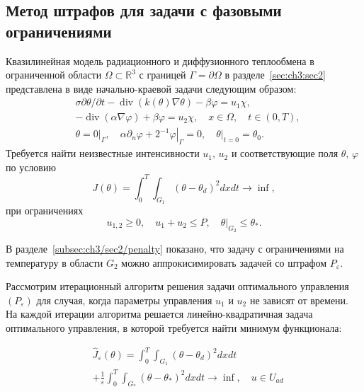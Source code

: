 
\subsection{Метод штрафов для задачи с фазовыми ограничениями}
\label{subsec:ch4/sec3/subsec5}
Квазилинейная модель радиационного и диффузионного теплообмена в ограниченной области
$\Omega \subset \mathbb{R}^{3}$ с границей $\Gamma=\partial \Omega$
в разделе~\ref{sec:ch3:sec2} представлена в виде начально-краевой задачи
следующим образом:
\begin{equation*}
    \begin{aligned}
        & \sigma \partial \theta / \partial t-\operatorname{div}(k(\theta) \nabla \theta)-\beta \varphi=u_{1} \chi, \\
        & -\operatorname{div}(\alpha \nabla \varphi)+\beta \varphi=u_{2} \chi, \quad x \in \Omega, \quad t \in(0, T), \\
        & \theta=\left.0\right|_{\Gamma}, \quad \alpha \partial_{n}
        \varphi+\left.2^{-1} \varphi\right|_{\Gamma}=0,\left.\quad \theta\right|_{t=0}=\theta_{0}.
    \end{aligned}
\end{equation*}
Требуется найти неизвестные интенсивности $u_1,\, u_2$ и соответствующие поля $\theta, \, \varphi$
по условию
\[
    J(\theta)=\int_{0}^{T}
    \int_{G_{1}}\left(\theta-\theta_{d}\right)^{2} d x d t \rightarrow \inf,
\]
при ограничениях
\[
    u_{1,2} \geq 0, \quad u_{1}+u_{2} \leq P,\left.\quad \theta\right|_{G_{2}} \leq \theta_{*}.
\]

В разделе~\ref{subsec:ch3/sec2/penalty} показано, что задачу с ограничениями
на температуру в области $G_2$ можно
аппрокисимировать задачей со штрафом $P_\varepsilon$.


Рассмотрим итерационный алгоритм решения задачи оптимального управления
$\left(P_{\varepsilon}\right)$ для случая, когда параметры управления
$u_{1}$ и $u_{2}$ не зависят от времени.
На каждой итерации алгоритма
решается линейно-квадратичная задача оптимального управления,
в которой требуется найти минимум функционала:

\begin{equation}
    \label{eq:3_2:9}
    \begin{aligned}
        &\widehat{J}_{\varepsilon}(\theta)=\int_{0}^{T}
        \int_{G_{1}}\left(\theta-\theta_{d}\right)^{2} d x d t \\
        &+\frac{1}{\varepsilon} \int_{0}^{T}
        \int_{G_{*}}\left(\theta-\theta_{*}\right)^{2} d x d t
        \rightarrow \inf, \quad u\in U_{a d}
    \end{aligned}
\end{equation}

